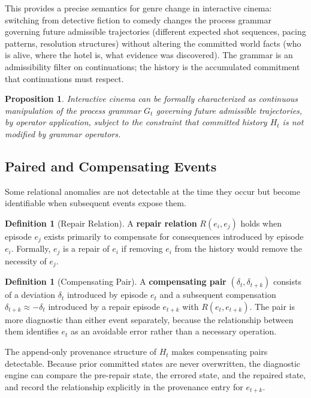 \documentclass[11pt,a4paper]{article}
\theoremstyle{plain}
\newtheorem{proposition}[theorem]{Proposition}
\theoremstyle{definition}
\newtheorem{definition}[theorem]{Definition}
\theoremstyle{remark}
\begin{document}
This provides a precise semantics for genre change in interactive cinema: switching from detective fiction to comedy changes the process grammar governing future admissible trajectories (different expected shot sequences, pacing patterns, resolution structures) without altering the committed world facts (who is alive, where the hotel is, what evidence was discovered). The grammar is an admissibility filter on continuations; the history is the accumulated commitment that continuations must respect.

\begin{proposition}
Interactive cinema can be formally characterized as continuous manipulation of the process grammar $G_t$ governing future admissible trajectories, by operator application, subject to the constraint that committed history $H_t$ is not modified by grammar operators.
\end{proposition}

\subsection{Paired and Compensating Events}

Some relational anomalies are not detectable at the time they occur but become identifiable when subsequent events expose them.

\begin{definition}[Repair Relation]
A \textbf{repair relation} $R(e_i, e_j)$ holds when episode $e_j$ exists primarily to compensate for consequences introduced by episode $e_i$. Formally, $e_j$ is a repair of $e_i$ if removing $e_i$ from the history would remove the necessity of $e_j$.
\end{definition}

\begin{definition}[Compensating Pair]
A \textbf{compensating pair} $(\delta_t, \delta_{t+k})$ consists of a deviation $\delta_t$ introduced by episode $e_t$ and a subsequent compensation $\delta_{t+k} \approx -\delta_t$ introduced by a repair episode $e_{t+k}$ with $R(e_t, e_{t+k})$. The pair is more diagnostic than either event separately, because the relationship between them identifies $e_t$ as an avoidable error rather than a necessary operation.
\end{definition}

The append-only provenance structure of $H_t$ makes compensating pairs detectable. Because prior committed states are never overwritten, the diagnostic engine can compare the pre-repair state, the errored state, and the repaired state, and record the relationship explicitly in the provenance entry for $e_{t+k}$.
\end{document}
